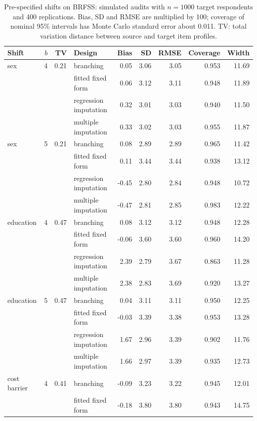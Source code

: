 \begin{table}[h]
\centering
\caption{Pre-specified shifts on BRFSS: simulated audits with $n=1000$ target respondents and 400 replications. Bias, SD and RMSE are multiplied by 100; coverage of nominal 95\% intervals has Monte Carlo standard error about 0.011. TV: total variation distance between source and target item profiles.}
\label{tab:shift}
\scriptsize
\setlength{\tabcolsep}{2.6pt}
\begin{tabular}{lrrlrrrrr}
\toprule
Shift & $b$ & TV & Design & Bias & SD & RMSE & Coverage & Width \\
\midrule
sex & 4 & 0.21 & branching & 0.05 & 3.06 & 3.05 & 0.953 & 11.69 \\
 &  &  & fitted fixed form & 0.06 & 3.12 & 3.11 & 0.948 & 11.89 \\
 &  &  & regression imputation & 0.32 & 3.01 & 3.03 & 0.940 & 11.50 \\
 &  &  & multiple imputation & 0.33 & 3.02 & 3.03 & 0.955 & 11.87 \\
sex & 5 & 0.21 & branching & 0.08 & 2.89 & 2.89 & 0.965 & 11.42 \\
 &  &  & fitted fixed form & 0.11 & 3.44 & 3.44 & 0.938 & 13.12 \\
 &  &  & regression imputation & -0.45 & 2.80 & 2.84 & 0.948 & 10.72 \\
 &  &  & multiple imputation & -0.47 & 2.81 & 2.85 & 0.983 & 12.22 \\
education & 4 & 0.47 & branching & 0.08 & 3.12 & 3.12 & 0.948 & 12.28 \\
 &  &  & fitted fixed form & -0.06 & 3.60 & 3.60 & 0.960 & 14.20 \\
 &  &  & regression imputation & 2.39 & 2.79 & 3.67 & 0.863 & 11.28 \\
 &  &  & multiple imputation & 2.38 & 2.83 & 3.69 & 0.920 & 13.27 \\
education & 5 & 0.47 & branching & 0.04 & 3.11 & 3.11 & 0.950 & 12.25 \\
 &  &  & fitted fixed form & -0.03 & 3.39 & 3.38 & 0.953 & 13.28 \\
 &  &  & regression imputation & 1.67 & 2.96 & 3.39 & 0.902 & 11.76 \\
 &  &  & multiple imputation & 1.66 & 2.97 & 3.39 & 0.935 & 12.73 \\
cost barrier & 4 & 0.41 & branching & -0.09 & 3.23 & 3.22 & 0.945 & 12.01 \\
 &  &  & fitted fixed form & -0.18 & 3.80 & 3.80 & 0.943 & 14.75 \\

\end{tabular}
\end{table}
